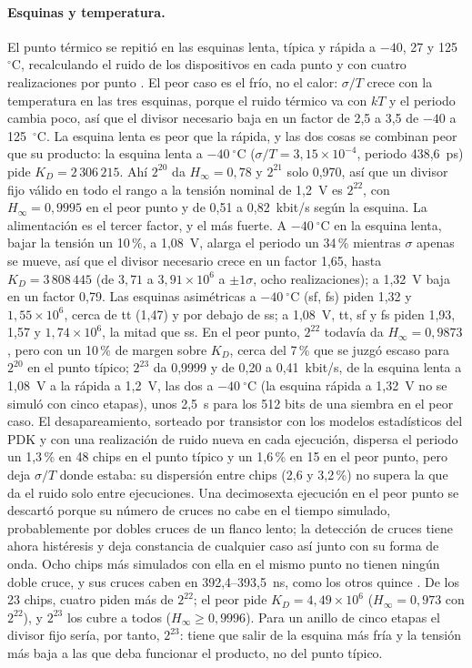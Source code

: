 \paragraph{Esquinas y temperatura.} El punto térmico se repitió en las
esquinas lenta, típica y rápida a $-40$, 27 y 125~$^\circ$C, recalculando
el ruido de los dispositivos en cada punto y con cuatro realizaciones por
punto \simu{}. El peor caso es el frío, no el calor: $\sigma/T$ crece con
la temperatura en las tres esquinas, porque el ruido térmico va con $kT$
y el periodo cambia poco, así que el divisor necesario baja en un factor
de 2,5 a 3,5 de $-40$ a 125~$^\circ$C. La esquina lenta es peor que la
rápida, y las dos cosas se combinan peor que su producto: la esquina lenta
a $-40~^\circ$C ($\sigma/T = 3{,}15\times10^{-4}$, periodo 438,6~ps) pide
$K_D = 2\,306\,215$. Ahí $2^{20}$ da $H_\infty = 0{,}78$ y $2^{21}$ solo
0,970, así que un divisor fijo válido en todo el rango a la tensión
nominal de 1,2~V es $2^{22}$, con $H_\infty = 0{,}9995$ en el peor punto
y de 0,51 a 0,82~kbit/s según la esquina. La alimentación es el tercer
factor, y el más fuerte. A $-40~^\circ$C en la esquina lenta, bajar la
tensión un 10\,\%, a 1,08~V, alarga el periodo un 34\,\% mientras
$\sigma$ apenas se mueve, así que el divisor necesario crece en un factor
1,65, hasta $K_D = 3\,808\,445$ (de $3{,}71$ a $3{,}91\times10^6$ a
$\pm1\sigma$, ocho realizaciones); a 1,32~V baja en un factor 0,79. Las
esquinas asimétricas a $-40~^\circ$C (sf, fs) piden 1,32 y
$1{,}55\times10^6$, cerca de tt (1,47) y por debajo de ss; a 1,08~V, tt,
sf y fs piden 1,93, 1,57 y $1{,}74\times10^6$, la mitad que ss. En el
peor punto, $2^{22}$ todavía da $H_\infty = 0{,}9873$, pero con un
10\,\% de margen sobre $K_D$, cerca del 7\,\% que se juzgó escaso para
$2^{20}$ en el punto típico; $2^{23}$ da 0,9999 y de 0,20 a
0,41~kbit/s, de la esquina lenta a 1,08~V a la rápida a 1,2~V, las dos a
$-40~^\circ$C (la esquina rápida a 1,32~V no se simuló con cinco etapas),
unos 2,5~s para los 512 bits de una siembra en el peor caso.
El desapareamiento, sorteado por transistor con los modelos estadísticos
del \ac{PDK} y con una realización de ruido nueva en cada ejecución,
dispersa el periodo un 1,3\,\% en 48 chips en el punto típico y un
1,6\,\% en 15 en el peor punto, pero deja $\sigma/T$ donde estaba: su
dispersión entre chips (2,6 y 3,2\,\%) no supera la que da el ruido solo
entre ejecuciones. Una decimosexta ejecución en el peor punto se descartó
porque su número de cruces no cabe en el tiempo simulado, probablemente
por dobles cruces de un flanco lento; la detección de cruces tiene ahora
histéresis y deja constancia de cualquier caso así junto con su forma de
onda. Ocho chips más simulados con ella en el mismo punto no tienen
ningún doble cruce, y sus cruces caben en 392,4--393,5~ns, como los otros
quince \simu{}. De los 23 chips, cuatro piden más de $2^{22}$; el peor
pide $K_D = 4{,}49\times10^6$ ($H_\infty = 0{,}973$ con $2^{22}$), y
$2^{23}$ los cubre a todos ($H_\infty \ge 0{,}9996$). Para un anillo de
cinco etapas el divisor fijo sería, por tanto, $2^{23}$: tiene que salir
de la esquina más fría y la tensión más baja a las que deba funcionar el
producto, no del punto típico.

